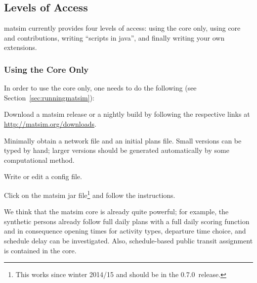 \subsection{Levels of Access}
\label{sec:levels-of-access}
\gls{matsim} currently provides four levels of access: using the core only, using core and \glspl{contribution}, writing ``scripts in \gls{java}'', and finally writing your own \glspl{extension}.

\subsubsection{Using the Core Only}
\label{sec:using-core-only}


In order to use the core only, one needs to do the following (see Section~\ref{sec:runningmatsim}):
\begin{compactitem}
\item Download a \gls{matsim} release or a nightly build by following the respective links at %
\url{http://matsim.org/downloads}.
\item Minimally obtain a network file and an initial plans file.  Small versions can be typed by hand; larger versions should be generated automatically by some computational method.
\item Write or edit a config file.
\item Click on the \gls{matsim} jar file\footnote{This works since winter 2014/15 and should be in the 0.7.0~release.} and follow the instructions. 
\end{compactitem}
We think that the \gls{matsim} core is already quite powerful; for example, the synthetic persons already follow full daily plans with a full daily scoring function and in consequence opening times for activity types, departure time choice, and schedule delay can be investigated. Also, schedule-based public transit assignment is contained in the core.

